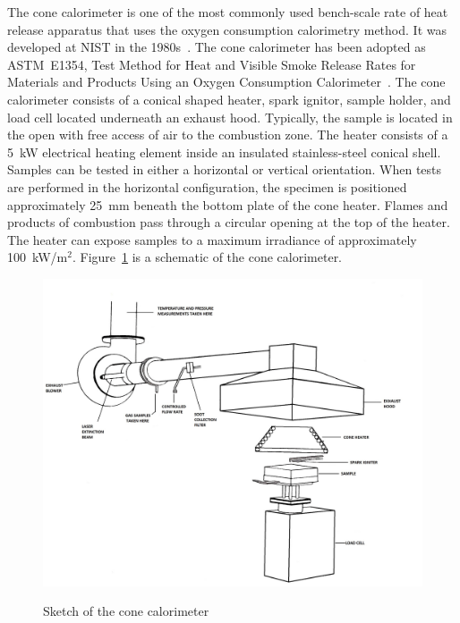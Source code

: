 \documentclass[twoside]{uocthesis}
\begin{document}
The cone calorimeter is one of the most commonly used bench-scale rate of heat release apparatus that uses the oxygen consumption calorimetry method. It was developed at NIST in the 1980s~\cite{babrauskas:1984}. The cone calorimeter has been adopted as ASTM~E1354, Test Method for Heat and Visible Smoke Release Rates for Materials and Products Using an Oxygen Consumption Calorimeter~\cite{ASTM_E1354}. The cone calorimeter consists of a conical shaped heater, spark ignitor, sample holder, and load cell located underneath an exhaust hood. Typically, the sample is located in the open with free access of air to the combustion zone. The heater consists of a 5~kW electrical heating element inside an insulated stainless-steel conical shell. Samples can be tested in either a horizontal or vertical orientation. When tests are performed in the horizontal configuration, the specimen is positioned approximately 25~mm beneath the bottom plate of the cone heater. Flames and products of combustion pass through a circular opening at the top of the heater. The heater can expose samples to a maximum irradiance of approximately 100~kW/m$^2$. Figure~\ref{Cone_Cal} is a schematic of the cone calorimeter.

\begin{figure}
	\centering
	\includegraphics[width=\textwidth]{../Figures/Cone_Cal} \\
	\caption[Sketch of the cone calorimeter]{Sketch of the cone calorimeter}
	\label{Cone_Cal}
\end{figure}
\end{document}
